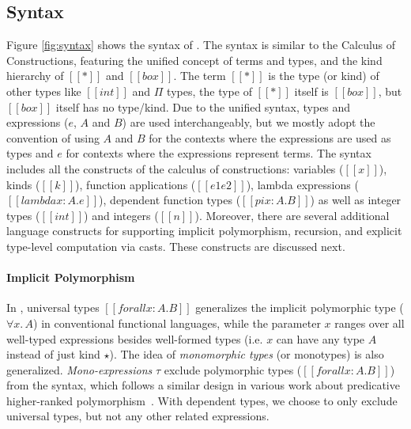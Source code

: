 \subsection{Syntax}

Figure \ref{fig:syntax} shows the syntax of \name. The syntax is similar
to the Calculus of Constructions, featuring the unified concept of terms and types,
and the kind hierarchy of $[[*]]$ and $[[box]]$.
The term $[[*]]$ is the type (or kind) of other types like $[[int]]$ and $\Pi$ types,
the type of $[[*]]$ itself is $[[box]]$, but $[[box]]$ itself has no type/kind.
Due to the unified syntax, types and
expressions ($e$, $A$ and $B$) are used
interchangeably, but we mostly adopt the convention of using $A$ and $B$
for the contexts where the expressions are used as types and $e$ for contexts
where the expressions represent terms.
The syntax includes all the constructs of the calculus of constructions:
variables ($[[x]]$), kinds ($[[k]]$), function applications  ($[[e1 e2]]$),
lambda expressions ($[[lambda x : A. e]]$), dependent function types ($[[pi x : A. B]]$)
as well as integer types ($[[int]]$) and integers ($[[n]]$).
Moreover, there are several additional language constructs for
supporting implicit polymorphism, recursion, and explicit type-level computation
via casts. These constructs are discussed next.

\paragraph{Implicit Polymorphism}
In \name, universal types $[[forall x : A. B]]$ generalizes the implicit
polymorphic type ($\forall x.\, A$) in conventional functional languages,
while the parameter $x$ ranges over all well-typed expressions besides well-formed
types (i.e. $x$ can have any type $A$ instead of just kind $\star$). The idea of
\emph{monomorphic types} (or monotypes) is also generalized.
\emph{Mono-expressions} $\tau$ exclude polymorphic types ($[[forall x : A. B]]$) from the syntax,
which follows a similar design in various work about predicative
higher-ranked polymorphism~\citep{odersky1996putting,dunfield2013complete,jones2007practical}.
With dependent types, we choose to only exclude universal types, but not
any other related expressions.

